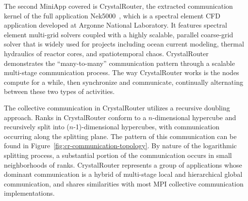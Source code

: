 
The second MiniApp covered is CrystalRouter, 
the extracted communication kernel of the full application Nek5000~\cite{nek5000}, 
which is a spectral element CFD application developed at Argonne National Laboratory. 
It features spectral element multi-grid solvers coupled with a highly scalable, 
parallel coarse-grid solver that is widely used for projects including ocean current modeling, 
thermal hydraulics of reactor cores, and spatiotemporal chaos. 
CrystalRouter demonstrates the ``many-to-many'' communication pattern 
through a scalable multi-stage communication process. 
The way CrystalRouter works is the nodes compute for a while, 
then synchronize and communicate, continually alternating between these two types of activities.

The collective communication in CrystalRouter utilizes a recursive doubling approach. 
Ranks in CrystalRouter conform to a $n$-dimensional hypercube 
and recursively split into ($n$-1)-dimensional hypercubes, 
with communication occurring along the splitting plane. 
The pattern of this communication can be found in Figure~\ref{fig:cr-communication-topology}. 
By nature of the logarithmic splitting process, 
a substantial portion of the communication occurs in small neighborhoods of ranks. 
CrystalRouter represents a group of applications whose dominant communication 
is a hybrid of multi-stage local and hierarchical global communication, 
and shares similarities with most MPI collective communication implementations.


